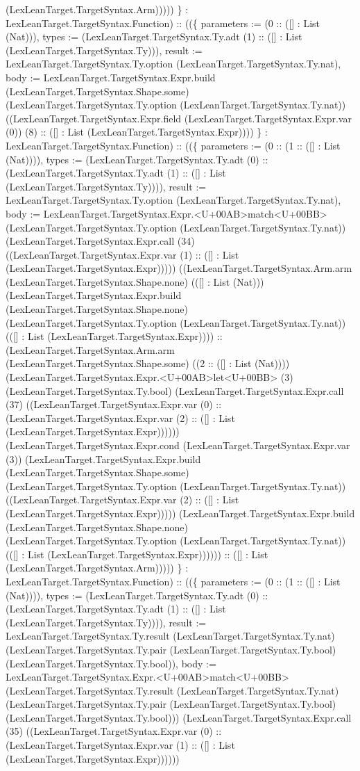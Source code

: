 \documentclass[11pt]{article}
\begin{document}
(LexLeanTarget.TargetSyntax.Arm))))) \} : LexLeanTarget.TargetSyntax.Function) :: ((\{ parameters := (0 :: ([] : List (Nat))), types := (LexLeanTarget.TargetSyntax.Ty.adt (1) :: ([] : List (LexLeanTarget.TargetSyntax.Ty))), result := LexLeanTarget.TargetSyntax.Ty.option (LexLeanTarget.TargetSyntax.Ty.nat), body := LexLeanTarget.TargetSyntax.Expr.build (LexLeanTarget.TargetSyntax.Shape.some) (LexLeanTarget.TargetSyntax.Ty.option (LexLeanTarget.TargetSyntax.Ty.nat)) ((LexLeanTarget.TargetSyntax.Expr.field (LexLeanTarget.TargetSyntax.Expr.var (0)) (8) :: ([] : List (LexLeanTarget.TargetSyntax.Expr)))) \} : LexLeanTarget.TargetSyntax.Function) :: ((\{ parameters := (0 :: (1 :: ([] : List (Nat)))), types := (LexLeanTarget.TargetSyntax.Ty.adt (0) :: (LexLeanTarget.TargetSyntax.Ty.adt (1) :: ([] : List (LexLeanTarget.TargetSyntax.Ty)))), result := LexLeanTarget.TargetSyntax.Ty.option (LexLeanTarget.TargetSyntax.Ty.nat), body := LexLeanTarget.TargetSyntax.Expr.<U+00AB>match<U+00BB> (LexLeanTarget.TargetSyntax.Ty.option (LexLeanTarget.TargetSyntax.Ty.nat)) (LexLeanTarget.TargetSyntax.Expr.call (34) ((LexLeanTarget.TargetSyntax.Expr.var (1) :: ([] : List (LexLeanTarget.TargetSyntax.Expr))))) ((LexLeanTarget.TargetSyntax.Arm.arm (LexLeanTarget.TargetSyntax.Shape.none) (([] : List (Nat))) (LexLeanTarget.TargetSyntax.Expr.build (LexLeanTarget.TargetSyntax.Shape.none) (LexLeanTarget.TargetSyntax.Ty.option (LexLeanTarget.TargetSyntax.Ty.nat)) (([] : List (LexLeanTarget.TargetSyntax.Expr)))) :: (LexLeanTarget.TargetSyntax.Arm.arm (LexLeanTarget.TargetSyntax.Shape.some) ((2 :: ([] : List (Nat)))) (LexLeanTarget.TargetSyntax.Expr.<U+00AB>let<U+00BB> (3) (LexLeanTarget.TargetSyntax.Ty.bool) (LexLeanTarget.TargetSyntax.Expr.call (37) ((LexLeanTarget.TargetSyntax.Expr.var (0) :: (LexLeanTarget.TargetSyntax.Expr.var (2) :: ([] : List (LexLeanTarget.TargetSyntax.Expr)))))) (LexLeanTarget.TargetSyntax.Expr.cond (LexLeanTarget.TargetSyntax.Expr.var (3)) (LexLeanTarget.TargetSyntax.Expr.build (LexLeanTarget.TargetSyntax.Shape.some) (LexLeanTarget.TargetSyntax.Ty.option (LexLeanTarget.TargetSyntax.Ty.nat)) ((LexLeanTarget.TargetSyntax.Expr.var (2) :: ([] : List (LexLeanTarget.TargetSyntax.Expr))))) (LexLeanTarget.TargetSyntax.Expr.build (LexLeanTarget.TargetSyntax.Shape.none) (LexLeanTarget.TargetSyntax.Ty.option (LexLeanTarget.TargetSyntax.Ty.nat)) (([] : List (LexLeanTarget.TargetSyntax.Expr)))))) :: ([] : List (LexLeanTarget.TargetSyntax.Arm))))) \} : LexLeanTarget.TargetSyntax.Function) :: ((\{ parameters := (0 :: (1 :: ([] : List (Nat)))), types := (LexLeanTarget.TargetSyntax.Ty.adt (0) :: (LexLeanTarget.TargetSyntax.Ty.adt (1) :: ([] : List (LexLeanTarget.TargetSyntax.Ty)))), result := LexLeanTarget.TargetSyntax.Ty.result (LexLeanTarget.TargetSyntax.Ty.nat) (LexLeanTarget.TargetSyntax.Ty.pair (LexLeanTarget.TargetSyntax.Ty.bool) (LexLeanTarget.TargetSyntax.Ty.bool)), body := LexLeanTarget.TargetSyntax.Expr.<U+00AB>match<U+00BB> (LexLeanTarget.TargetSyntax.Ty.result (LexLeanTarget.TargetSyntax.Ty.nat) (LexLeanTarget.TargetSyntax.Ty.pair (LexLeanTarget.TargetSyntax.Ty.bool) (LexLeanTarget.TargetSyntax.Ty.bool))) (LexLeanTarget.TargetSyntax.Expr.call (35) ((LexLeanTarget.TargetSyntax.Expr.var (0) :: (LexLeanTarget.TargetSyntax.Expr.var (1) :: ([] : List (LexLeanTarget.TargetSyntax.Expr)))))) 
\end{document}
